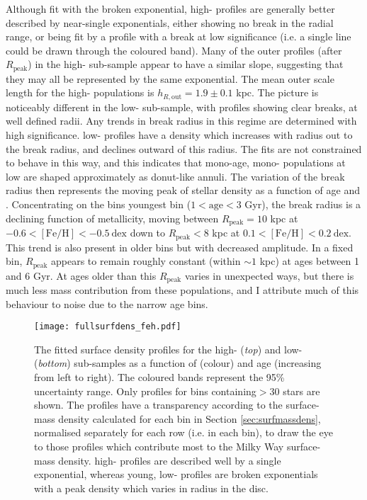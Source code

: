 Although fit with the broken exponential, high-\afe{} profiles are generally better described by near-single exponentials, either showing no break in the radial range, or being fit by a profile with a break at low significance (i.e. a single line could be drawn through the coloured band). Many of the outer profiles (after $R_{\mathrm{peak}}$) in the high-\afe{} sub-sample appear to have a similar slope, suggesting that they may all be represented by the same exponential. The mean outer scale length for the high-\afe{} populations is $h_{R,\text{out}} = 1.9\pm 0.1$ kpc. The picture is noticeably different in the low-\afe{} sub-sample, with profiles showing clear breaks, at well defined radii. Any trends in break radius in this regime are determined with high significance. low-\afe{} profiles have a density which increases with radius out to the break radius, and declines outward of this radius. The fits are not constrained to behave in this way, and this indicates that mono-age, mono-\feh{} populations at low \feh{} are shaped approximately as donut-like annuli. The variation of the break radius then represents the moving peak of stellar density as a function of age and \feh{}. Concentrating on the bins youngest bin ($1 < \mathrm{age} < 3$ Gyr), the break radius is a declining function of metallicity, moving between $R_{\mathrm{peak}}=10$ kpc at $-0.6 < \mathrm{[Fe/H]} < -0.5\ \mathrm{dex}$ down to $R_{\mathrm{peak}} < 8$ kpc at $0.1 < \mathrm{[Fe/H]} < 0.2\ \mathrm{dex}$. This trend is also present in older bins but with decreased amplitude. In a fixed \feh{} bin, $R_{\mathrm{peak}}$ appears to remain roughly constant (within $\sim1$ kpc) at ages between 1 and 6 Gyr.  At ages older than this $R_{\mathrm{peak}}$ varies in unexpected ways, but there is much less mass contribution from these populations, and I attribute much of this behaviour to noise due to the narrow age bins. 


\begin{landscape}
\begin{figure}
\texttt{[image: fullsurfdens\_feh.pdf]}
      \centering
     \caption[Surface density profiles of mono-age, mono-\feh{} populations in the low and high-\afe{} disc components of the Milky Way]{The fitted surface density profiles for the high-\afe{} (\emph{top}) and low-\afe{} (\emph{bottom}) sub-samples as a function of \feh{} (colour) and age (increasing from left to right). The coloured bands represent the 95\% uncertainty range.  Only profiles for bins containing$ > 30$ stars are shown. The profiles have a transparency according to the surface-mass density calculated for each bin in Section \ref{sec:surfmassdens}, normalised separately for each row (i.e. in each \feh{} bin), to draw the eye to those profiles which contribute most to the Milky Way surface-mass density. high-\afe{} profiles are described well by a single exponential, whereas young, low-\afe{} profiles are broken exponentials with a peak density which varies in radius in the disc.}
     \label{fig:surfdens}
 \end{figure}
\end{landscape}


